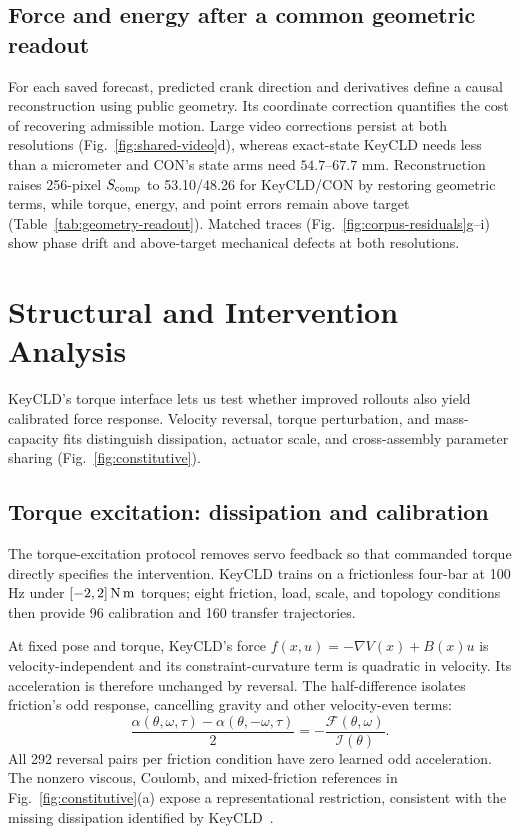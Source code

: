 \documentclass[10pt,twocolumn,letterpaper]{article}
\begin{document}
\subsection{Force and energy after a common geometric readout}
For each saved forecast, predicted crank direction and derivatives define a causal reconstruction using public geometry. Its coordinate correction quantifies the cost of recovering admissible motion. Large video corrections persist at both resolutions (Fig.~\ref{fig:shared-video}d), whereas exact-state KeyCLD needs less than a micrometer and CON's state arms need $54.7$--$67.7$ mm. Reconstruction raises 256-pixel $S_{\rm comp}$ to 53.10/48.26 for KeyCLD/CON by restoring geometric terms, while torque, energy, and point errors remain above target (Table~\ref{tab:geometry-readout}). Matched traces (Fig.~\ref{fig:corpus-residuals}g--i) show phase drift and above-target mechanical defects at both resolutions.

\section{Structural and Intervention Analysis}
\label{sec:structure}
KeyCLD's torque interface lets us test whether improved rollouts also yield calibrated force response. Velocity reversal, torque perturbation, and mass-capacity fits distinguish dissipation, actuator scale, and cross-assembly parameter sharing (Fig.~\ref{fig:constitutive}).

\subsection{Torque excitation: dissipation and calibration}
The torque-excitation protocol removes servo feedback so that commanded torque directly specifies the intervention. KeyCLD trains on a frictionless four-bar at 100 Hz under $[-2,2]\,\mathrm{N\,m}$ torques; eight friction, load, scale, and topology conditions then provide 96 calibration and 160 transfer trajectories.

At fixed pose and torque, KeyCLD's force $f(x,u)=-\nabla V(x)+B(x)u$ is velocity-independent and its constraint-curvature term is quadratic in velocity. Its acceleration is therefore unchanged by reversal. The half-difference isolates friction's odd response, cancelling gravity and other velocity-even terms:
\begin{equation}
\frac{\alpha(\theta,\omega,\tau)-\alpha(\theta,-\omega,\tau)}{2}
=-\frac{\mathcal F(\theta,\omega)}{\mathcal I(\theta)}.
\label{eq:odd}
\end{equation}
All 292 reversal pairs per friction condition have zero learned odd acceleration. The nonzero viscous, Coulomb, and mixed-friction references in Fig.~\ref{fig:constitutive}(a) expose a representational restriction, consistent with the missing dissipation identified by KeyCLD~\cite{daems2024keycld}.
\end{document}
